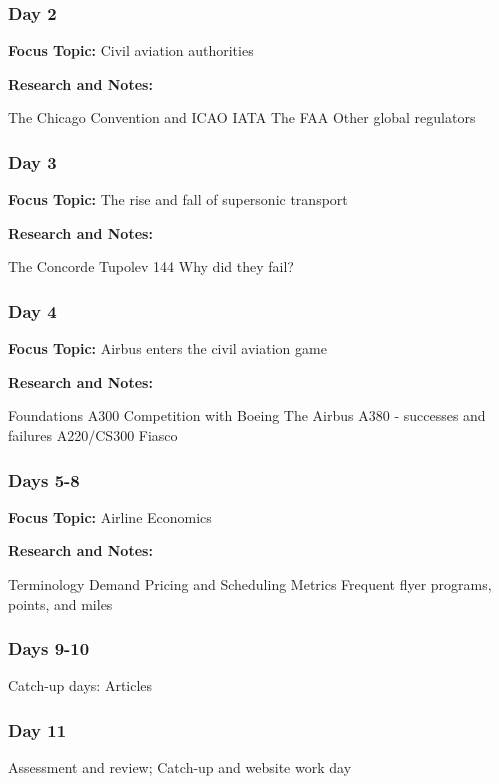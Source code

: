 \documentclass[12pt]{article}
\begin{document}
\subsubsection{Day 2}
\textbf{Focus Topic:} Civil aviation authorities

\textbf{Research and Notes:}
\begin{outline}
    \1 The Chicago Convention and ICAO
\1 IATA
\1 The FAA
\1 Other global regulators
\end{outline}
\subsubsection{Day 3}
\textbf{Focus Topic:} The rise and fall of supersonic transport

\textbf{Research and Notes:}
\begin{outline}
    \1 The Concorde
\1 Tupolev 144
\1 Why did they fail?
\end{outline}
\subsubsection{Day 4}
\textbf{Focus Topic:} Airbus enters the civil aviation game

\textbf{Research and Notes:}
\begin{outline}
    \1 Foundations
\1 A300
\1 Competition with Boeing
\1 The Airbus A380 - successes and failures
\1 A220/CS300 Fiasco
\end{outline}

\subsubsection{Days 5-8}
\textbf{Focus Topic:} Airline Economics

\textbf{Research and Notes:}
\begin{outline}
    \1 Terminology
\1 Demand
\1 Pricing and Scheduling
\1 Metrics
\1 Frequent flyer programs, points, and miles
\end{outline}

\subsubsection{Days 9-10}
Catch-up days: Articles 

\subsubsection{Day 11}
Assessment and review; Catch-up and website work day
\end{document}
